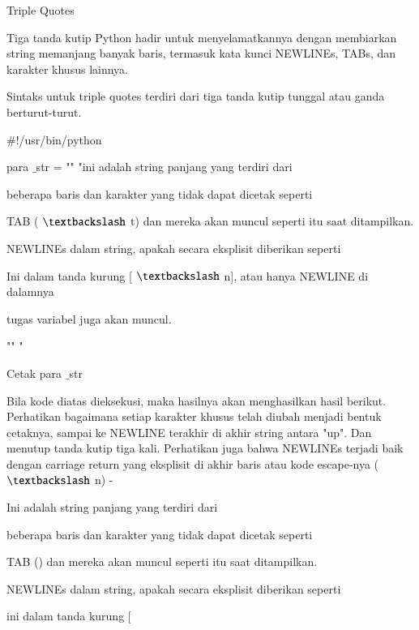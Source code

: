 \documentclass[a4paper,12pt]{report}
\begin{document}
\vspace{12pt}
\noindent 
Triple Quotes \par
\vspace{12pt}
\noindent 
Tiga tanda kutip Python hadir untuk menyelamatkannya dengan membiarkan string memanjang banyak baris, termasuk kata kunci NEWLINEs, TABs, dan karakter khusus lainnya. \par
\noindent 
Sintaks untuk triple quotes terdiri dari tiga tanda kutip tunggal atau ganda berturut-turut. \par
\noindent 
\vspace{12pt}
\noindent 
 $  \#  $!/usr/bin/python \par
\noindent 
\vspace{12pt}
\noindent 
para $  \_  $str = "" "ini adalah string panjang yang terdiri dari \par
\noindent 
beberapa baris dan karakter yang tidak dapat dicetak seperti \par
\noindent 
TAB ( $  \textbackslash  $ t) dan mereka akan muncul seperti itu saat ditampilkan. \par
\noindent 
NEWLINEs dalam string, apakah secara eksplisit diberikan seperti \par
\noindent 
Ini dalam tanda kurung [ $  \textbackslash  $ n], atau hanya NEWLINE di dalamnya \par
\noindent 
tugas variabel juga akan muncul. \par
\noindent 
"" " \par
\noindent 
Cetak para $  \_  $str \par
\noindent 
Bila kode diatas dieksekusi, maka hasilnya akan menghasilkan hasil berikut. Perhatikan bagaimana setiap karakter khusus telah diubah menjadi bentuk cetaknya, sampai ke NEWLINE terakhir di akhir string antara "up". Dan menutup tanda kutip tiga kali. Perhatikan juga bahwa NEWLINEs terjadi baik dengan carriage return yang eksplisit di akhir baris atau kode escape-nya ( $  \textbackslash  $ n) - \par
\noindent 
Ini adalah string panjang yang terdiri dari \par
\noindent 
beberapa baris dan karakter yang tidak dapat dicetak seperti \par
\noindent 
TAB () dan mereka akan muncul seperti itu saat ditampilkan. \par
\noindent 
NEWLINEs dalam string, apakah secara eksplisit diberikan seperti \par
\noindent 
ini dalam tanda kurung [ \par
\end{document}

